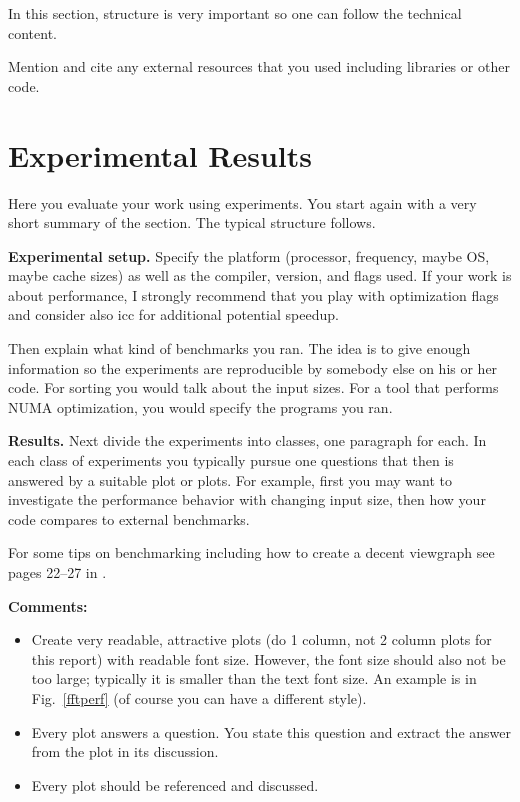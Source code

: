 \documentclass[letterpaper]{article}
\newcommand{\mypar}[1]{{\bf #1.}}
\begin{document}
In this section, structure is very important so one can follow the technical content.

Mention and cite any external resources that you used including libraries or other code.

\section{Experimental Results}\label{sec:exp}

Here you evaluate your work using experiments. You start again with a
very short summary of the section. The typical structure follows.

\mypar{Experimental setup} Specify the platform (processor, frequency, maybe OS, maybe cache sizes)
as well as the compiler, version, and flags used. If your work is about performance, 
I strongly recommend that you play with optimization flags and consider also icc for additional potential speedup.

Then explain what kind of benchmarks you ran. The idea is to give enough information so the experiments are reproducible by somebody else on his or her code.
For sorting you would talk about the input sizes. For a tool that performs NUMA optimization, you would specify the programs you ran.

\mypar{Results}
Next divide the experiments into classes, one paragraph for each. In each class of experiments you typically pursue one questions that then is answered by a suitable plot or plots. For example, first you may want to investigate the performance behavior with changing input size, then how your code compares to external benchmarks.

For some tips on benchmarking including how to create a decent viewgraph see pages 22--27 in \cite{Pueschel:10}.

{\bf Comments:}
\begin{itemize}
\item Create very readable, attractive plots (do 1 column, not 2 column plots
for this report) with readable font size. However, the font size should also not be too large; typically it is smaller than the text font size.
An example is in Fig.~\ref{fftperf} (of course you can have a different style).
\item Every plot answers a question. You state this question and extract the
answer from the plot in its discussion.
\item Every plot should be referenced and discussed.
\end{itemize}
\end{document}

